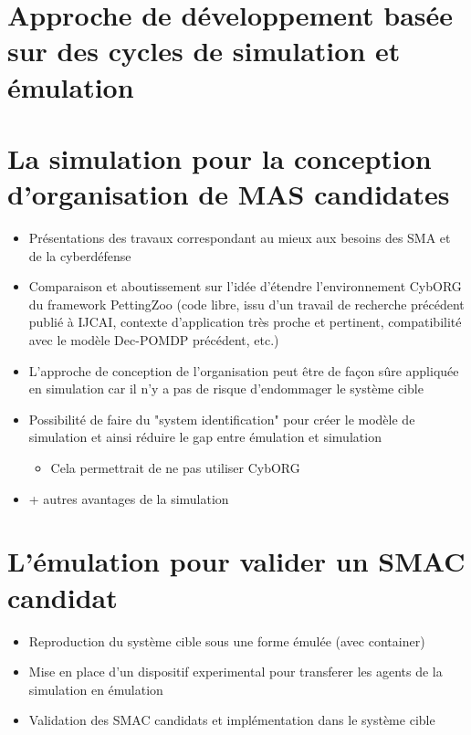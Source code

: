 \section{Approche de développement basée sur des cycles de simulation et émulation}

\section{La simulation pour la conception d'organisation de MAS candidates}
\begin{itemize}

  \item Présentations des travaux correspondant au mieux aux besoins des SMA et de la cyberdéfense
  \item Comparaison et aboutissement sur l’idée d’étendre l’environnement CybORG du framework PettingZoo (code libre, issu d’un travail de recherche précédent publié à IJCAI, contexte d’application très proche et pertinent, compatibilité avec le modèle Dec-POMDP précédent, etc.)
  \item L'approche de conception de l'organisation peut être de façon sûre appliquée en simulation car il n'y a pas de risque d'endommager le système cible
  \item Possibilité de faire du "system identification" pour créer le modèle de simulation et ainsi réduire le gap entre émulation et simulation
        \begin{itemize}
          \item Cela permettrait de ne pas utiliser CybORG
        \end{itemize}
  \item + autres avantages de la simulation
\end{itemize}

\section{L'émulation pour valider un SMAC candidat}
\begin{itemize}

  \item Reproduction du système cible sous une forme émulée (avec container)
  \item Mise en place d'un dispositif experimental pour transferer les agents de la simulation en émulation
  \item Validation des SMAC candidats et implémentation dans le système cible

\end{itemize}
